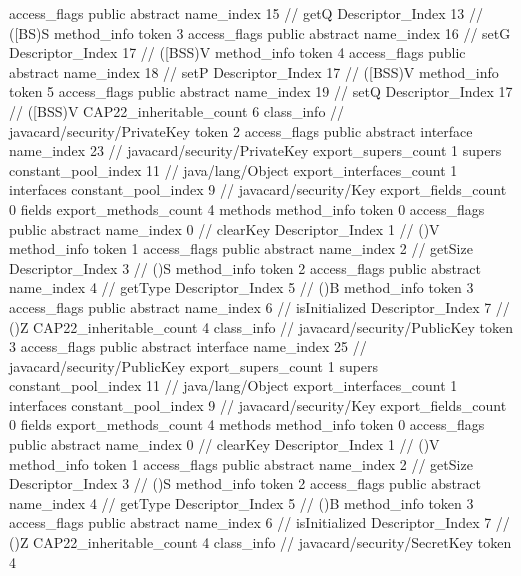 {{{{{					access_flags	public abstract
					name_index	15		// getQ
					Descriptor_Index	13		// ([BS)S
				}
				method_info {
					token	3
					access_flags	public abstract
					name_index	16		// setG
					Descriptor_Index	17		// ([BSS)V
				}
				method_info {
					token	4
					access_flags	public abstract
					name_index	18		// setP
					Descriptor_Index	17		// ([BSS)V
				}
				method_info {
					token	5
					access_flags	public abstract
					name_index	19		// setQ
					Descriptor_Index	17		// ([BSS)V
				}
			}
			CAP22_inheritable_count	6
		}
		class_info {		// javacard/security/PrivateKey
			token	2
			access_flags	public abstract interface
			name_index	23		// javacard/security/PrivateKey
			export_supers_count	1
			supers {
				constant_pool_index	11		// java/lang/Object
			}
			export_interfaces_count	1
			interfaces {
				constant_pool_index	9		// javacard/security/Key
			}
			export_fields_count	0
			fields {
			}
			export_methods_count	4
			methods {
				method_info {
					token	0
					access_flags	public abstract
					name_index	0		// clearKey
					Descriptor_Index	1		// ()V
				}
				method_info {
					token	1
					access_flags	public abstract
					name_index	2		// getSize
					Descriptor_Index	3		// ()S
				}
				method_info {
					token	2
					access_flags	public abstract
					name_index	4		// getType
					Descriptor_Index	5		// ()B
				}
				method_info {
					token	3
					access_flags	public abstract
					name_index	6		// isInitialized
					Descriptor_Index	7		// ()Z
				}
			}
			CAP22_inheritable_count	4
		}
		class_info {		// javacard/security/PublicKey
			token	3
			access_flags	public abstract interface
			name_index	25		// javacard/security/PublicKey
			export_supers_count	1
			supers {
				constant_pool_index	11		// java/lang/Object
			}
			export_interfaces_count	1
			interfaces {
				constant_pool_index	9		// javacard/security/Key
			}
			export_fields_count	0
			fields {
			}
			export_methods_count	4
			methods {
				method_info {
					token	0
					access_flags	public abstract
					name_index	0		// clearKey
					Descriptor_Index	1		// ()V
				}
				method_info {
					token	1
					access_flags	public abstract
					name_index	2		// getSize
					Descriptor_Index	3		// ()S
				}
				method_info {
					token	2
					access_flags	public abstract
					name_index	4		// getType
					Descriptor_Index	5		// ()B
				}
				method_info {
					token	3
					access_flags	public abstract
					name_index	6		// isInitialized
					Descriptor_Index	7		// ()Z
				}
			}
			CAP22_inheritable_count	4
		}
		class_info {		// javacard/security/SecretKey
			token	4
}}}
